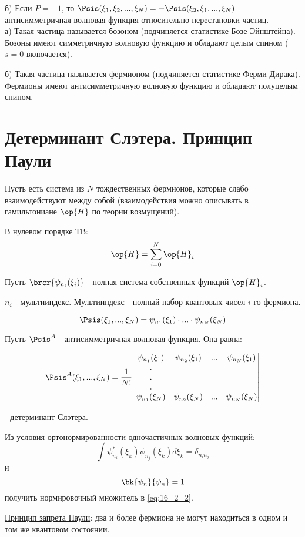 б) Если $P = -1$, то  $\Psis(\xi_1, \xi_2, ..., \xi_N) = -\Psis(\xi_2, \xi_1, ..., \xi_N)$ - антисимметричная волновая функция относительно перестановки частиц.\\

а) Такая частица называется бозоном (подчиняется статистике Бозе-Эйнштейна). Бозоны имеют симметричную волновую функцию и обладают целым спином ($s = 0$ включается).

б) Такая частица называется фермионом (подчиняется статистике Ферми-Дирака). Фермионы имеют антисимметричную волновую функцию и обладают полуцелым спином.

\section{Детерминант Слэтера. Принцип Паули}

Пусть есть система из $N$ тождественных фермионов, которые слабо взаимодействуют между собой (взаимодействия можно описывать в гамильтониане $\op{H}$ по теории возмущений).

В нулевом порядке ТВ:
$$
\op{H} = \sum_{i=0}^N\op{H}_i
$$

Пусть $\brcr{\psi_{n_i}(\xi_i)}$ - полная система собственных функций $\op{H}_i$.

$n_i$ - мультииндекс. Мультииндекс - полный набор квантовых чисел $i$-го фермиона.

\begin{equation}
\label{eq:16_2_1}
\Psis(\xi_1, ..., \xi_N) = \psi_{n_1}(\xi_1) \cdot ... \cdot \psi_{n_N}(\xi_N)
\end{equation}

Пусть $\Psis^A$ - антисимметричная волновая функция. Она равна:

\begin{equation}
\label{eq:16_2_2}
\Psis^A(\xi_1, ..., \xi_N) = \frac{1}{N!} \left |
  \begin{matrix} 
  \psi_{n_1}(\xi_1) & \psi_{n_2}(\xi_1) & ... &  \psi_{n_N}(\xi_1) \\
  .                                &                                  &    &                                    \\
  .                                &                                  &    &                                    \\
  .                                &                                  &    &                                    \\
  \psi_{n_1}(\xi_N) & \psi_{n_2}(\xi_N) & ... &  \psi_{n_N}(\xi_N)
  \end{matrix} \right |
\end{equation}

- детерминант Слэтера.

\begin{excr}
Из условия ортонормированности одночастичных волновых функций: 
$$
\int \psi_{n_i}^*(\xi_k) \psi_{n_j}(\xi_k) d\xi_k = \delta_{n_i n_j}
$$
и 
$$
\bk{\psi_n}{\psi_n} = 1
$$
получить нормировочный множитель в \eqref{eq:16_2_2}.
\end{excr}

\underline{Принцип запрета Паули}: два и более фермиона не могут находиться в одном и том же квантовом состоянии.